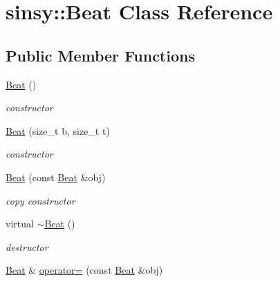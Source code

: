 \hypertarget{classsinsy_1_1Beat}{\section{sinsy\-:\-:\-Beat \-Class \-Reference}
\label{classsinsy_1_1Beat}
}
\subsection*{\-Public \-Member \-Functions}
\begin{DoxyCompactItemize}
\item 
\hypertarget{classsinsy_1_1Beat_a03d3ffaf8c5a8dcdc274ef6576c11cf1}{\hyperlink{classsinsy_1_1Beat_a03d3ffaf8c5a8dcdc274ef6576c11cf1}{\-Beat} ()}\label{classsinsy_1_1Beat_a03d3ffaf8c5a8dcdc274ef6576c11cf1}

\begin{DoxyCompactList}\small\item\em constructor \end{DoxyCompactList}\item 
\hypertarget{classsinsy_1_1Beat_ab80a692df355003a09fd3292d27c4232}{\hyperlink{classsinsy_1_1Beat_ab80a692df355003a09fd3292d27c4232}{\-Beat} (size\-\_\-t b, size\-\_\-t t)}\label{classsinsy_1_1Beat_ab80a692df355003a09fd3292d27c4232}

\begin{DoxyCompactList}\small\item\em constructor \end{DoxyCompactList}\item 
\hypertarget{classsinsy_1_1Beat_a9c3bdec54e76a93bcf7fed0f56eb25fd}{\hyperlink{classsinsy_1_1Beat_a9c3bdec54e76a93bcf7fed0f56eb25fd}{\-Beat} (const \hyperlink{classsinsy_1_1Beat}{\-Beat} \&obj)}\label{classsinsy_1_1Beat_a9c3bdec54e76a93bcf7fed0f56eb25fd}

\begin{DoxyCompactList}\small\item\em copy constructor \end{DoxyCompactList}\item 
\hypertarget{classsinsy_1_1Beat_a9e02578982d9af9763416f56db17289a}{virtual \hyperlink{classsinsy_1_1Beat_a9e02578982d9af9763416f56db17289a}{$\sim$\-Beat} ()}\label{classsinsy_1_1Beat_a9e02578982d9af9763416f56db17289a}

\begin{DoxyCompactList}\small\item\em destructor \end{DoxyCompactList}\item 
\hypertarget{classsinsy_1_1Beat_a544534524fbf67231eae9e82d0f9c77d}{\hyperlink{classsinsy_1_1Beat}{\-Beat} \& \hyperlink{classsinsy_1_1Beat_a544534524fbf67231eae9e82d0f9c77d}{operator=} (const \hyperlink{classsinsy_1_1Beat}{\-Beat} \&obj)}\label{classsinsy_1_1Beat_a544534524fbf67231eae9e82d0f9c77d}


\end{DoxyCompactItemize}
